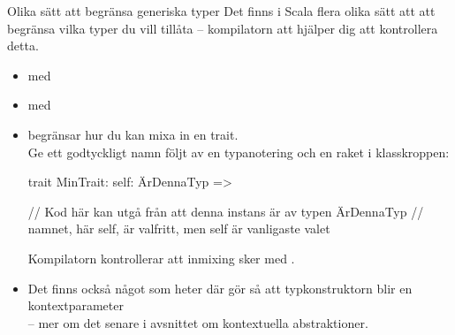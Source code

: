 \begin{Slide}{Olika sätt att begränsa generiska typer}\SlideFontSmall
Det finns i Scala flera olika sätt att att begränsa vilka typer du vill tillåta -- kompilatorn att hjälper dig att kontrollera detta. 

\begin{itemize}\SlideFontSmall
  \item {}  med 
  \item {}  med 
  \item {}  begränsar hur du kan mixa in en trait. \\
  \pause Ge ett godtyckligt namn följt av en typanotering och en raket i klasskroppen:
  \begin{Code}
  trait MinTrait:
    self: ÄrDennaTyp =>

    // Kod här kan utgå från att denna instans är av typen ÄrDennaTyp 
    // namnet, här self, är valfritt, men self är vanligaste valet  
  \end{Code}
  Kompilatorn kontrollerar att inmixing sker med .
  \item Det finns också något som heter   där \code{[A: B]} gör så att typkonstruktorn  blir en kontextparameter \\-- mer om det senare i avsnittet om kontextuella abstraktioner.
\end{itemize}
\end{Slide}

